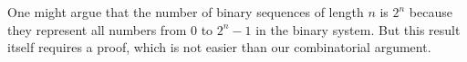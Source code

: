 

\setcounter{section}{2}
\setcounter{subsection}{2}
\setcounter{dfn}{6}

\begin{rem}
One might argue that the number of binary sequences of length $n$ is $2^n$ because they represent all numbers from $0$ to $2^n - 1$ in the binary system.
But this result itself requires a proof, which is not easier than our combinatorial argument.
\end{rem}


